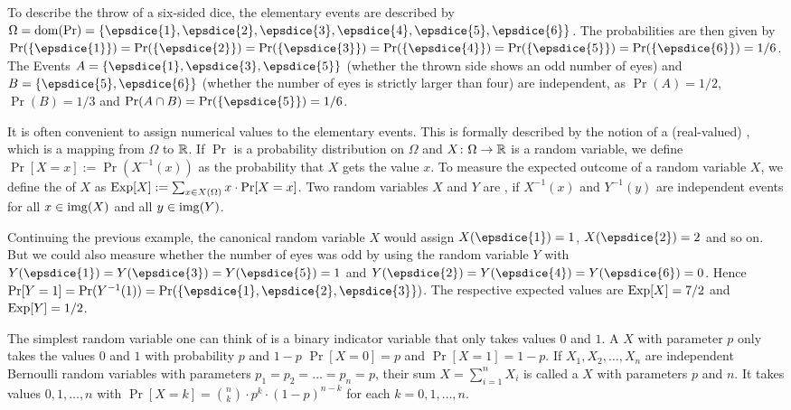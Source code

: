 \begin{example}
  To describe the throw of a six-sided dice, the elementary events are
  described by
  $\Omega=\dom(\Pr)=\{\epsdice{1},\epsdice{2},\epsdice{3},\epsdice{4},\epsdice{5},\epsdice{6}\}$. The
  probabilities are then given by
  $\Pr(\{\epsdice{1}\})=\Pr(\{\epsdice{2}\})=\Pr(\{\epsdice{3}\})=\Pr(\{\epsdice{4}\})=\Pr(\{\epsdice{5}\})=\Pr(\{\epsdice{6}\})=1/6$. The
  Events $A=\{\epsdice{1},\epsdice{3},\epsdice{5}\}$ (whether the thrown
  side shows an odd number of eyes) and $B=\{\epsdice{5},\epsdice{6}\}$
  (whether the number of eyes is strictly larger than four) are
  independent, as $\Pr(A)=1/2$, $\Pr(B)=1/3$ and
  $\Pr(A\cap B)=\Pr(\{\epsdice{5}\})=1/6$. 
\end{example}

It is often convenient to assign numerical values to the elementary
events. This is formally described by the notion of a
(real-valued) , which is a mapping from $\Omega$
to $\mathbb{R}$. If $\Pr$ is a probability distribution on $\Omega$ and $X\colon
\Omega\to \mathbb{R}$ is a random variable, we define $\Pr[X=x] :=
\Pr(X^{-1}(x))$ as the probability that $X$ gets the value $x$. To
measure the expected outcome of a random variable $X$, we define the
 of $X$ as $\operatorname{Exp}[X] := \sum_{x\in X(\Omega)}x\cdot
\Pr[X=x]$. Two random variables $X$ and $Y$ are , if $X^{-1}(x)$ and $Y^{-1}(y)$ are independent
events for all $x\in \operatorname{img}(X)$ and all $y\in \operatorname{img}(Y)$. 
\begin{example}
  Continuing the previous example, the canonical random variable $X$
  would assign $X(\epsdice{1})=1$, $X(\epsdice{2})=2$ and so on. But we
  could also measure whether the number of eyes was odd by using the
  random variable $Y$ with
  $Y(\epsdice{1})=Y(\epsdice{3})=Y(\epsdice{5})=1$ and
  $Y(\epsdice{2})=Y(\epsdice{4})=Y(\epsdice{6})=0$. Hence
  $\Pr[Y=1]=\Pr(Y^{-1}(1))=\Pr(\{\epsdice{1},\epsdice{2},\epsdice{3}\})$.
  The respective expected values are $\operatorname{Exp}[X]=7/2$ and $\operatorname{Exp}[Y]=1/2$.
\end{example}


The simplest random variable one can think of is a binary indicator
variable that only takes values $0$ and $1$. A  $X$ with parameter $p$ only takes the values $0$ and $1$
with probability $p$ and $1-p$ \ie $\Pr[X=0]=p$ and $\Pr[X=1]=1-p$. If
$X_{1},X_{2},\ldots,X_{n}$ are independent Bernoulli random variables
with parameters $p_{1}=p_{2}=\ldots=p_{n}=p$, their sum
$X=\sum_{i=1}^{n}X_{i}$ is called a  $X$
with parameters $p$ and $n$. It takes values $0,1,\ldots,n$ with
$\Pr[X=k]=\binom{n}{k}\cdot p^{k}\cdot (1-p)^{n-k}$ for each
$k=0,1,\ldots,n$. 

